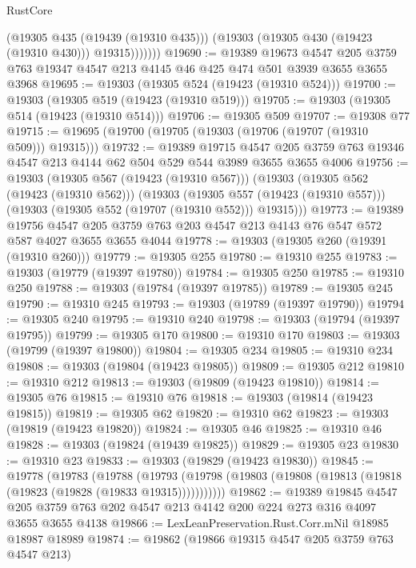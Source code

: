 \begin{lexlean}{RustCore}
\begin{coremodule}
                (@19305 @435 (@19439 (@19310 @435)))
                (@19303 (@19305 @430 (@19423 (@19310 @430))) @19315)))))))
@19690 := @19389
    @19673
    @4547
    @205
    @3759
    @763
    @19347
    @4547
    @213
    @4145
    @46
    @425
    @474
    @501
    @3939
    @3655
    @3655
    @3968
@19695 := @19303 (@19305 @524 (@19423 (@19310 @524)))
@19700 := @19303 (@19305 @519 (@19423 (@19310 @519)))
@19705 := @19303 (@19305 @514 (@19423 (@19310 @514)))
@19706 := @19305 @509
@19707 := @19308 @77
@19715 := @19695 (@19700 (@19705 (@19303 (@19706 (@19707 (@19310 @509))) @19315)))
@19732 := @19389
    @19715
    @4547
    @205
    @3759
    @763
    @19346
    @4547
    @213
    @4144
    @62
    @504
    @529
    @544
    @3989
    @3655
    @3655
    @4006
@19756 := @19303
    (@19305 @567 (@19423 (@19310 @567)))
    (@19303
      (@19305 @562 (@19423 (@19310 @562)))
      (@19303
        (@19305 @557 (@19423 (@19310 @557)))
        (@19303 (@19305 @552 (@19707 (@19310 @552))) @19315)))
@19773 := @19389
    @19756
    @4547
    @205
    @3759
    @763
    @203
    @4547
    @213
    @4143
    @76
    @547
    @572
    @587
    @4027
    @3655
    @3655
    @4044
@19778 := @19303 (@19305 @260 (@19391 (@19310 @260)))
@19779 := @19305 @255
@19780 := @19310 @255
@19783 := @19303 (@19779 (@19397 @19780))
@19784 := @19305 @250
@19785 := @19310 @250
@19788 := @19303 (@19784 (@19397 @19785))
@19789 := @19305 @245
@19790 := @19310 @245
@19793 := @19303 (@19789 (@19397 @19790))
@19794 := @19305 @240
@19795 := @19310 @240
@19798 := @19303 (@19794 (@19397 @19795))
@19799 := @19305 @170
@19800 := @19310 @170
@19803 := @19303 (@19799 (@19397 @19800))
@19804 := @19305 @234
@19805 := @19310 @234
@19808 := @19303 (@19804 (@19423 @19805))
@19809 := @19305 @212
@19810 := @19310 @212
@19813 := @19303 (@19809 (@19423 @19810))
@19814 := @19305 @76
@19815 := @19310 @76
@19818 := @19303 (@19814 (@19423 @19815))
@19819 := @19305 @62
@19820 := @19310 @62
@19823 := @19303 (@19819 (@19423 @19820))
@19824 := @19305 @46
@19825 := @19310 @46
@19828 := @19303 (@19824 (@19439 @19825))
@19829 := @19305 @23
@19830 := @19310 @23
@19833 := @19303 (@19829 (@19423 @19830))
@19845 := @19778
    (@19783
      (@19788
        (@19793 (@19798 (@19803 (@19808 (@19813 (@19818 (@19823 (@19828 (@19833 @19315)))))))))))
@19862 := @19389
    @19845
    @4547
    @205
    @3759
    @763
    @202
    @4547
    @213
    @4142
    @200
    @224
    @273
    @316
    @4097
    @3655
    @3655
    @4138
@19866 := LexLeanPreservation.Rust.Corr.mNil @18985 @18987 @18989
@19874 := @19862 (@19866 @19315 @4547 @205 @3759 @763 @4547 @213)

\end{coremodule}
\end{lexlean}
